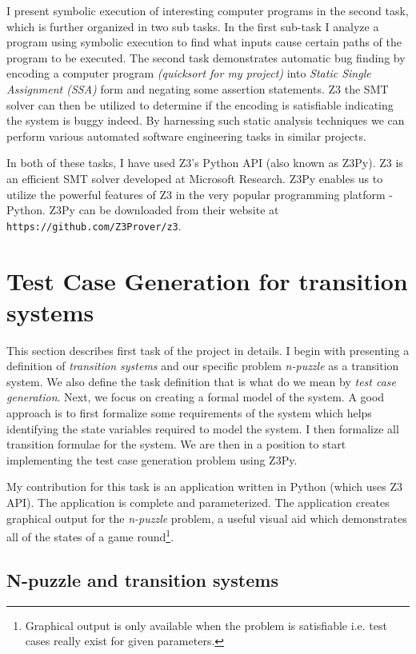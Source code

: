 \documentclass{sig-alternate-05-2015}
\begin{document}
I present symbolic execution of interesting computer programs in the second task, which is further organized in two sub tasks. In the first sub-task I analyze a program using symbolic execution to find what inputs cause certain paths of the program to be executed. The second task demonstrates automatic bug finding by encoding a computer program \textit{(quicksort for my project)} into \textit{Static Single Assignment (SSA)} form and negating some assertion statements. Z3 the SMT solver can then be utilized to determine if the encoding is satisfiable indicating the system is buggy indeed. By harnessing such static analysis techniques we can perform various automated software engineering tasks in similar projects.

In both of these tasks, I have used Z3's Python API (also known as Z3Py). Z3 is an efficient SMT solver \cite{DeMoura:Z3} developed at Microsoft Research. Z3Py enables us to utilize the powerful features of Z3 in the very popular programming platform - Python. Z3Py can be downloaded from their website at \texttt{https://github.com/Z3Prover/z3}.

\section{Test Case Generation for transition systems}

This section describes first task of the project in details. I begin
with presenting a definition of \textit{transition systems} and our
specific problem \textit{n-puzzle} as a transition system. We also
define the task definition that is what do we mean by \textit{test 
case generation}. Next, we focus on creating a formal model of the 
system. A good approach is to first formalize some requirements
of the system which helps identifying the state variables required
to model the system. I then formalize all transition formulae for 
the system. We are then in a position to start implementing the
test case generation problem using Z3Py.

My contribution for this task is an application written in Python 
(which uses Z3 API). The application is complete and parameterized.
The application creates graphical output for the \textit{n-puzzle}
problem, a useful visual aid which demonstrates all of the states
of a game round\footnote{Graphical output is only available when the 
problem is satisfiable i.e. test cases really exist for given parameters.}.  

\subsection{{\subsecit N-puzzle} and transition systems}
\end{document}
